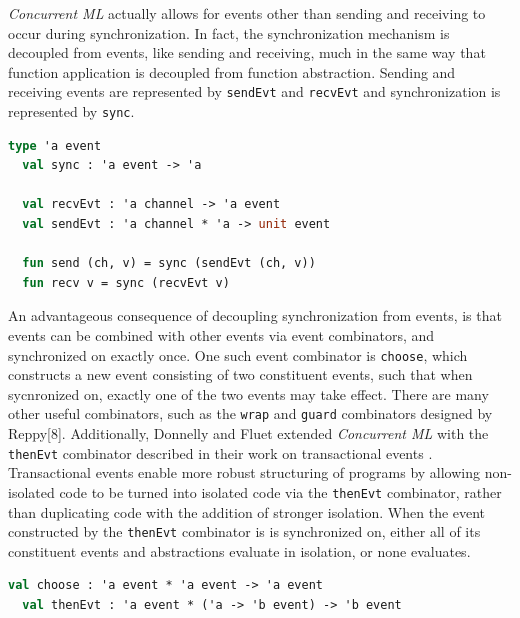 \documentclass{article}
\begin{document}
\textit{Concurrent ML} actually allows for events other than sending and receiving to
occur during synchronization. In fact, the synchronization mechanism is decoupled from
events, like sending and receiving, much in the same way that function application is decoupled
from function abstraction. Sending and receiving events are represented by \lstinline{sendEvt}
and \lstinline{recvEvt} and synchronization is represented by \lstinline{sync}.

\begin{lstlisting}[language=ML, mathescape]
  type 'a event
  val sync : 'a event -> 'a

  val recvEvt : 'a channel -> 'a event
  val sendEvt : 'a channel * 'a -> unit event

  fun send (ch, v) = sync (sendEvt (ch, v))
  fun recv v = sync (recvEvt v)
  \end{lstlisting}

An advantageous consequence of decoupling synchronization from events, is that events can be
combined with other events via event combinators, and synchronized on exactly once. One such
event combinator is \lstinline{choose}, which constructs a new event consisting of two
constituent events, such that when sycnronized on, exactly one of the two events may take
effect. There are many other useful combinators, such as the \lstinline{wrap} and
\lstinline{guard} combinators designed by Reppy[8]. Additionally, Donnelly and Fluet extended
\textit{Concurrent ML} with the \lstinline{thenEvt} combinator described in their work on
transactional events \cite{transactional_events}. Transactional events enable more robust
structuring of programs by allowing non-isolated code to be turned into isolated code via
the \lstinline{thenEvt} combinator, rather than duplicating code with the addition of stronger
isolation. When the event constructed by the \lstinline{thenEvt} combinator is is synchronized
on, either all of its constituent events and abstractions evaluate in isolation, or none
evaluates.

\begin{lstlisting}[language=ML, mathescape]
  val choose : 'a event * 'a event -> 'a event
  val thenEvt : 'a event * ('a -> 'b event) -> 'b event
  \end{lstlisting}
\end{document}
